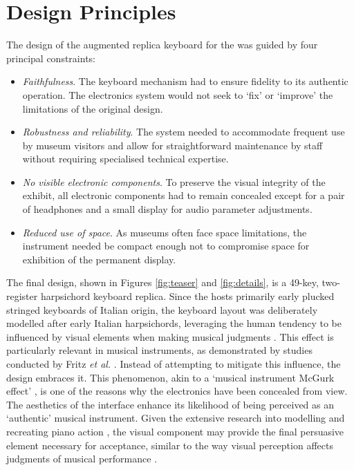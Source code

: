\section{Design Principles}\label{design}

The design of the augmented replica keyboard for the  was guided by four principal constraints:

\begin{itemize}
    \item \emph{Faithfulness}. The keyboard mechanism had to ensure fidelity to its authentic operation. The electronics system would not seek to `fix' or `improve' the limitations of the original design.     
    \item \emph{Robustness and reliability}. The system needed to accommodate frequent use by museum visitors and allow for straightforward maintenance by staff without requiring specialised technical expertise.
    \item \emph{No visible electronic components}. To preserve the visual integrity of the exhibit, all electronic components had to remain concealed except for a pair of headphones and a small display for audio parameter adjustments.
    \item \emph{Reduced use of space}. As museums often face space limitations, the instrument needed be compact enough not to compromise space for exhibition of the permanent display. 
\end{itemize}

The final design, shown in Figures \ref{fig:teaser} and \ref{fig:details}, is a 49-key, two-register harpsichord keyboard replica. Since the  hosts primarily early plucked stringed keyboards of Italian origin, the keyboard layout was deliberately modelled after early Italian harpsichords, leveraging the human tendency to be influenced by visual elements when making musical judgments \cite{tsay_sight_2013}. This effect is particularly relevant in musical instruments, as demonstrated by studies conducted by Fritz \emph{et al.} \cite{fritz_player_2012, fritz_soloist_2014, fritz_listener_2017}. Instead of attempting to mitigate this influence, the design embraces it. This phenomenon, akin to a `musical instrument McGurk effect’ \cite{mcgurk_hearing_1976,politzer_mcgurk_2019}, is one of the reasons why the electronics have been concealed from view. The aesthetics of the interface enhance its likelihood of being perceived as an `authentic' musical instrument. Given the extensive research into modelling and recreating piano action \cite{cadoz_a-modular_1990, gillespie_haptic_1996, timmermans_multibody-based_2020}, the visual component may provide the final persuasive element necessary for acceptance, similar to the way visual perception affects judgments of musical performance \cite{tsay_sight_2013}.

